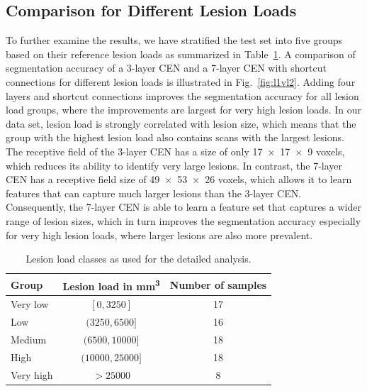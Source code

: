 \subsection{Comparison for Different Lesion Loads}

To further examine the results, we have stratified the test set into five groups
based on their reference lesion loads as summarized in Table~\ref{tab:groups}. A
comparison of segmentation accuracy of a 3-layer CEN and a 7-layer CEN with
shortcut connections for different lesion loads is illustrated in
Fig.~\ref{fig:l1vl2}. Adding four layers and shortcut connections improves the
segmentation accuracy for all lesion load groups, where the improvements are
largest for very high lesion loads. In our data set, lesion load is strongly
correlated with lesion size, which means that the group with the highest lesion
load also contains scans with the largest lesions. The receptive field of
the 3-layer CEN has a size of only \num{17x17x9} voxels, which reduces its
ability to identify very large lesions. In contrast, the 7-layer CEN has a
receptive field size of \num{49x53x26} voxels, which allows it to learn features
that can capture much larger lesions than the 3-layer CEN. Consequently, the
7-layer CEN is able to learn a feature set that captures a wider range of lesion
sizes, which in turn improves the segmentation accuracy especially for very high
lesion loads, where larger lesions are also more prevalent.

\begin{table}[tb]
\caption{Lesion load classes as used for the detailed analysis.}
\label{tab:groups}
\centering
\begin{tabular}{@{}lcc@{}}
\toprule
Group & Lesion load in \si{\cubic\milli\metre} & Number of samples \\
\midrule
Very low & $[0,3250]$ & 17 \\
Low      & $(3250,6500]$ & 16 \\
Medium & $(6500,10000]$ & 18 \\
High & $(10000,25000]$ & 18 \\
Very high & $> 25000$ & 8 \\
\bottomrule
\end{tabular}
\end{table}

